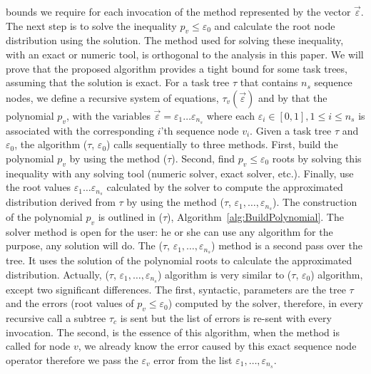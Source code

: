 \documentclass{article}
\begin{document}
bounds we require for each invocation of the \Sequence method represented by the vector 
$\overrightarrow{\varepsilon}$. The next step is to solve the inequality $p_v \leq \varepsilon_0$ and calculate the 
root node distribution using the solution. The method used for solving these inequality, with an exact or numeric tool, is orthogonal to the analysis in this paper. 
We will prove that the proposed algorithm provides a tight bound for some task trees, assuming that 
the solution is exact. 
For a task tree $\tau $ that contains $n_s$ sequence nodes, we define a recursive system of equations, $ \tau_v(\overrightarrow{\varepsilon}) $ and by that the polynomial $p_v$, with the variables $\overrightarrow{\varepsilon} =\varepsilon_1 \dots \varepsilon_{n_s}$ where each $\varepsilon_i\in [0,1],  1\leq i \leq n_s $ is associated with the corresponding $i$'th sequence node $v_i$.
Given a task tree $\tau$ and $\varepsilon_0$, the algorithm \NetworkTight($\tau$, $\varepsilon_0$) calls sequentially to three methods. First, build the polynomial $ p_v $ by using the method \EstimateError($\tau$). Second, find $p_v \leq \varepsilon_0$ roots by solving this inequality with any solving tool (numeric solver, exact solver, etc.). Finally, use the root values $\varepsilon_1 \dots \varepsilon_{n_s}$ calculated by the solver to compute the approximated distribution derived from $\tau$ by using the method \CalcNetwork($\tau$, $\varepsilon_1, \dots, \varepsilon_{n_s}$).
The construction of the polynomial $p_v$ is outlined in \EstimateError($\tau$), Algorithm~\ref{alg:BuildPolynomial}. The solver method is open for the user: he or she can use any algorithm for the purpose, any solution will do. 
The \CalcNetwork($\tau$, $\varepsilon_1, \dots, \varepsilon_{n_s}$) method is a second pass over the tree. It uses the solution of the 
polynomial roots to calculate the approximated distribution. Actually, \CalcNetwork($\tau$, $\varepsilon_1, \dots, \varepsilon_{n_s}$) algorithm is very similar to \Network($\tau$, $\varepsilon_0$) algorithm, except two significant differences. The first, syntactic,  \CalcNetwork parameters are the tree $\tau$ and the errors (root values of $p_v \leq \varepsilon_0$) computed by the solver, therefore, in every recursive call a subtree $\tau_c$ is sent but the list of errors is re-sent with every invocation. The second, is the essence of this algorithm, when the \Sequence method is called for node $v$, we already know the error caused by this exact sequence node operator therefore we pass the $\varepsilon_v $ error from the list $\varepsilon_1, \dots, \varepsilon_{n_s}$.
\end{document}
